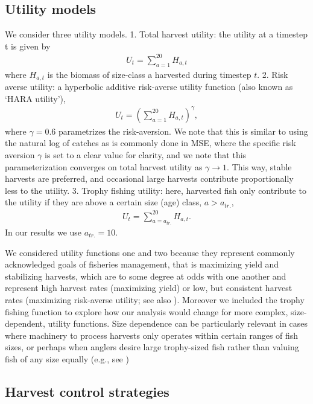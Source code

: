 \documentclass[floatfix,nofootinbib,longbibliography,notitlepage]{revtex4-1}
\begin{document}
\subsection{Utility models}

We consider three utility models. 
1. Total harvest utility: the utility at a timestep t is given by
\begin{align}
    U_t = \sum_{a=1}^{20} H_{a,t}
\end{align}
where $H_{a,t}$ is the biomass of size-class a harvested during timestep $t$. 
2. Risk averse utility: a hyperbolic additive risk-averse utility function (also known as ‘HARA utility’), 
\begin{align}
    U_t = \left(
    	\sum_{a=1}^{20} H_{a,t}
    \right)^\gamma,
\end{align}
where $\gamma=0.6$ parametrizes the risk-aversion. 
We note that this is similar to using the natural log of catches as is commonly done in MSE, where the specific risk aversion $\gamma$ is set to a clear value for clarity, and we note that this parameterization converges on total harvest utility as $\gamma\to1$.  
This way, stable harvests are preferred, and occasional large harvests contribute proportionally less to the utility. 
3. Trophy fishing utility: here, harvested fish only contribute to the utility if they are above a certain size (age) class, $a > a_{tr.}$,
\begin{align}
    U_t = \sum_{a=a_{tr.}}^{20} H_{a,t}.
\end{align}
In our results we use $a_{tr.}=10$.

We considered utility functions one and two because they represent commonly acknowledged goals of fisheries management, that is maximizing yield and stabilizing harvests, which are to some degree at odds with one another and represent high harvest rates (maximizing yield) or low, but consistent harvest rates (maximizing risk-averse utility; see also \cite{walters-parma-1996,collie2021}).  
Moreover we included the trophy fishing function to explore how our analysis would change for more complex, size-dependent, utility functions. 
Size dependence can be particularly relevant in cases where machinery to process harvests only operates within certain ranges of fish sizes, or perhaps when anglers desire large trophy-sized fish rather than valuing fish of any size equally (e.g., see \cite{murphy-willis-book})

\subsection{Harvest control strategies}
\end{document}
